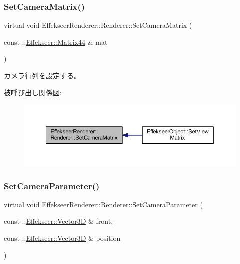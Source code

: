\subsubsection{\texorpdfstring{Set\+Camera\+Matrix()}{SetCameraMatrix()}}
{\footnotesize\ttfamily virtual void Effekseer\+Renderer\+::\+Renderer\+::\+Set\+Camera\+Matrix (\begin{DoxyParamCaption}\item[{const \+::\mbox{\hyperlink{struct_effekseer_1_1_matrix44}{Effekseer\+::\+Matrix44}} \&}]{mat }\end{DoxyParamCaption})\hspace{0.3cm}{\ttfamily [pure virtual]}}



カメラ行列を設定する。 

被呼び出し関係図\+:\nopagebreak
\begin{figure}[H]
\begin{center}
\leavevmode
\includegraphics[width=350pt]{class_effekseer_renderer_1_1_renderer_a406e4bf44f11d3437af46cca718529b0_icgraph}
\end{center}
\end{figure}
\mbox{\label{class_effekseer_renderer_1_1_renderer_aab9cecfcbbc9c3c0a968ce47704fc157}} 
\subsubsection{\texorpdfstring{Set\+Camera\+Parameter()}{SetCameraParameter()}}
{\footnotesize\ttfamily virtual void Effekseer\+Renderer\+::\+Renderer\+::\+Set\+Camera\+Parameter (\begin{DoxyParamCaption}\item[{const \+::\mbox{\hyperlink{struct_effekseer_1_1_vector3_d}{Effekseer\+::\+Vector3D}} \&}]{front,  }\item[{const \+::\mbox{\hyperlink{struct_effekseer_1_1_vector3_d}{Effekseer\+::\+Vector3D}} \&}]{position }\end{DoxyParamCaption})\hspace{0.3cm}{\ttfamily [pure virtual]}}



